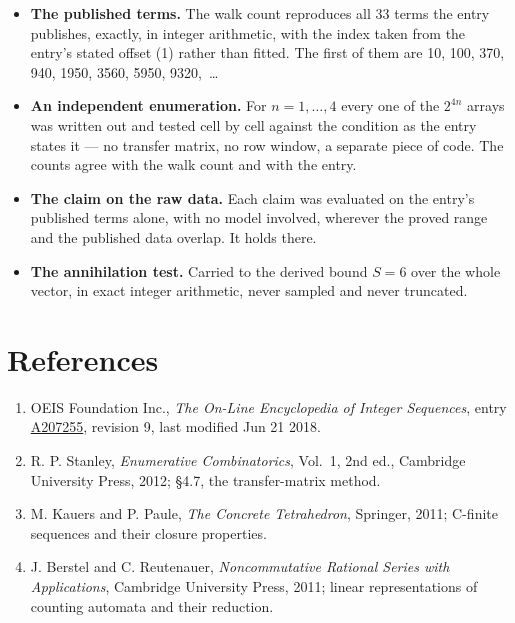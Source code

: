 \documentclass[11pt]{article}
\theoremstyle{definition}
\begin{document}
\begin{itemize}

\item {\bfseries The published terms.} The walk count reproduces all 33 terms the entry publishes, exactly, in integer arithmetic, with the index taken from the entry's stated offset (1) rather than fitted. The first of them are 10, 100, 370, 940, 1950, 3560, 5950, 9320,~\dots

\item {\bfseries An independent enumeration.} For $n = 1,\dots,4$ every one of the $2^{4n}$ arrays was written out and tested cell by cell against the condition as the entry states it --- no transfer matrix, no row window, a separate piece of code. The counts agree with the walk count and with the entry.

\item {\bfseries The claim on the raw data.} Each claim was evaluated on the entry's published terms alone, with no model involved, wherever the proved range and the published data overlap. It holds there.

\item {\bfseries The annihilation test.} Carried to the derived bound $S = 6$ over the whole vector, in exact integer arithmetic, never sampled and never truncated.

\end{itemize}

\section{References}

\begin{enumerate}

\item OEIS Foundation Inc., \emph{The On-Line Encyclopedia of Integer Sequences}, entry \href{https://oeis.org/A207255}{A207255}, revision 9, last modified Jun 21 2018.

\item R. P. Stanley, \emph{Enumerative Combinatorics}, Vol.~1, 2nd ed., Cambridge University Press, 2012; \S4.7, the transfer-matrix method.

\item M. Kauers and P. Paule, \emph{The Concrete Tetrahedron}, Springer, 2011; C-finite sequences and their closure properties.

\item J. Berstel and C. Reutenauer, \emph{Noncommutative Rational Series with Applications}, Cambridge University Press, 2011; linear representations of counting automata and their reduction.

\end{enumerate}
\end{document}
